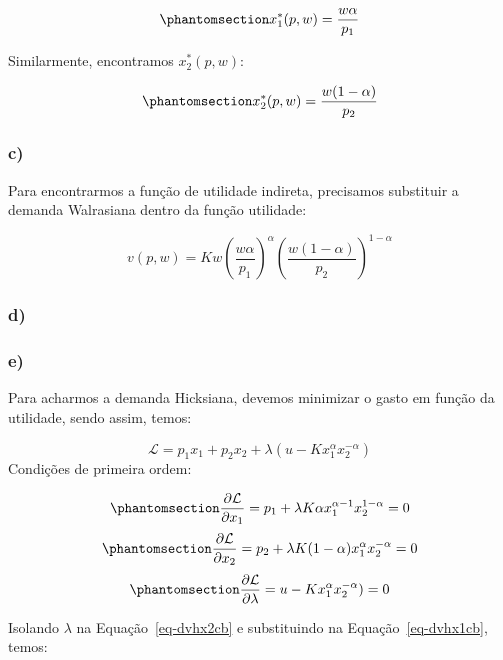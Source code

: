 \documentclass[
  letterpaper,
  DIV=11,
  numbers=noendperiod]{scrartcl}
\newcommand{\Lagr}{\mathcal{L}}
\begin{document}
\begin{equation}\phantomsection\label{eq-dmwx1}{
x_1^*(p,w) = \frac{w \alpha}{p_1}
}\end{equation}

Similarmente, encontramos \(x_2^*(p,w)\):

\begin{equation}\phantomsection\label{eq-dmwx2}{
x_2^*(p,w) = \frac{w (1-\alpha)}{p_2}
}\end{equation}

\subsubsection{c)}\label{c-1}

Para encontrarmos a função de utilidade indireta, precisamos substituir
a demanda Walrasiana dentro da função utilidade:

\[
v(p, w) =   Kw\left(\frac{w\alpha}{p_1}  \right)^\alpha \left(\frac{w(1-\alpha)}{p_2}  \right)^{1-\alpha}
\]

\subsubsection{d)}\label{d}

\subsubsection{e)}\label{e}

Para acharmos a demanda Hicksiana, devemos minimizar o gasto em função
da utilidade, sendo assim, temos:

\[
\mathcal{L} = p_1x_1 + p_2x_2 + \lambda(u - Kx_1^\alpha x_2^{-\alpha})
\] Condições de primeira ordem:

\begin{equation}\phantomsection\label{eq-dvhx1cb}{
\pdv{\Lagr}{x_1} = p_1 + \lambda K\alpha x_1^{\alpha-1}x_2^{1-\alpha} = 0
}\end{equation} \begin{equation}\phantomsection\label{eq-dvhx2cb}{
\pdv{\Lagr}{x_2} = p_2 + \lambda K(1-\alpha) x_1^{\alpha}x_2^{-\alpha} = 0
}\end{equation} \begin{equation}\phantomsection\label{eq-dvhlcb}{
\pdv{\Lagr}{\lambda} = u - Kx_1^\alpha x_2^{-\alpha}) = 0
}\end{equation}

Isolando \(\lambda\) na Equação~\ref{eq-dvhx2cb} e substituindo na
Equação~\ref{eq-dvhx1cb}, temos:
\end{document}
